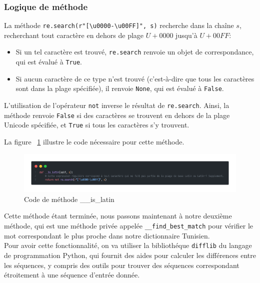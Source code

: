 \subsubsection{Logique de méthode}
\noindent
La méthode \texttt{re.search(r"[\textbackslash u0000-\textbackslash u00FF]", s)} recherche dans la chaîne \( s \), recherchant tout caractère en dehors de plage \( U+0000 \) jusqu'à \( U+00FF \):
\begin{itemize}
	\item Si un tel caractère est trouvé, \texttt{re.search} renvoie un objet de correspondance, qui est évalué à \texttt{True}.
	\item Si aucun caractère de ce type n'est trouvé (c'est-à-dire que tous les caractères sont dans la plage spécifiée), il renvoie \texttt{None}, qui est évalué à \texttt{False}.
\end{itemize}
L'utilisation de l'opérateur \texttt{not} inverse le résultat de \texttt{re.search}. Ainsi, la méthode renvoie \texttt{False} si des caractères se trouvent en dehors de la plage Unicode spécifiée, et \texttt{True} si tous les caractères s'y trouvent.

\noindent
La figure ~\ref{fig:islatin} illustre le code nécessaire pour cette méthode.

\begin{figure}[H]
	\centering
	\includegraphics[width=1\textwidth]{logos/islatin.png}
	\caption{Code de méthode \_\_is\_latin}
	\label{fig:islatin}
\end{figure}

\noindent
Cette méthode étant terminée, nous passons maintenant à notre deuxième méthode, qui est une méthode privée appelée \texttt{\_\_find\_best\_match} pour vérifier le mot correspondant le plus proche dans notre dictionnaire Tunisien. \\
Pour avoir cette fonctionnalité, on va utiliser la bibliothéque \texttt{difflib} du langage de programmation Python, qui fournit des aides pour calculer les différences entre les séquences, y compris des outils pour trouver des séquences correspondant étroitement à une séquence d'entrée donnée.

